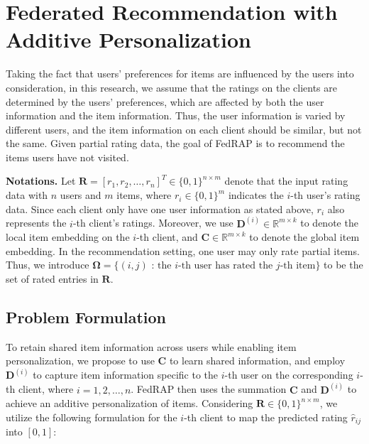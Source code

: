 \documentclass{article} %
\begin{document}
\section{Federated Recommendation with Additive Personalization}
\label{sec:method}

Taking the fact that users' preferences for items are influenced by the users into consideration,
in this research, we assume that the ratings on the clients are determined by the users' preferences, 
which are affected by both the user information and the item information.
Thus, the user information is varied by different users, and the item information on each client should be similar, but not the same.
Given partial rating data, the goal of FedRAP is to recommend the items users have not visited.

\textbf{Notations.} Let $\mathbf{R} = [r_1, r_2, \dots, r_n]^T \in \{0, 1\}^{n \times m}$ denote that the input rating data with $n$ users and $m$ items, 
where $r_i \in \{0, 1\}^m$ indicates the $i$-th user's rating data.
Since each client only have one user information as stated above, $r_i$ also represents the $i$-th client's ratings.
Moreover, we use $\mathbf{D}^{(i)} \in \mathbb{R}^{m \times k}$ to denote the local item embedding on the $i$-th client, and  $\mathbf{C} \in \mathbb{R}^{m \times k}$ to denote the global item embedding.
In the recommendation setting, one user may only rate partial items.
Thus, we introduce $\mathbf{\Omega} = \{(i, j)\text{ : } \text{the $i$-th user has rated the $j$-th item}\}$ to be the set of rated entries in $\mathbf{R}$.

\subsection{Problem Formulation}

To retain shared item information across users while enabling item personalization, 
we propose to use $\mathbf{C}$ to learn shared information, and employ $\mathbf{D}^{(i)}$ to capture item information specific to the $i$-th user on the corresponding $i$-th client, where $i = 1, 2, \dots, n$. 
FedRAP then uses the summation $\mathbf{C}$ and $\mathbf{D}^{(i)}$ to achieve an additive personalization of items.
Considering $\mathbf{R} \in \{0, 1\}^{n \times m}$, we utilize the following formulation for the $i$-th client to map the predicted rating $\hat{r}_{ij}$ into $[0, 1]$:
\end{document}
